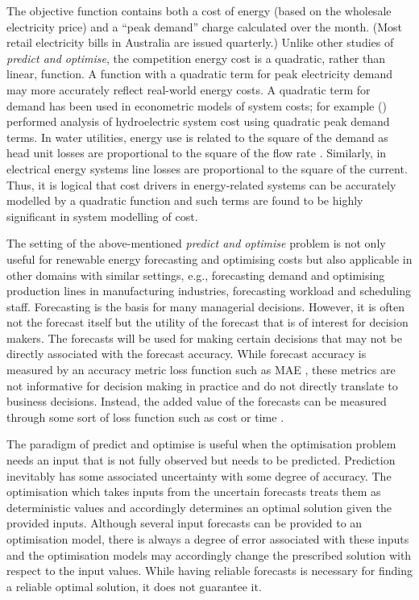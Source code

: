 \documentclass[conference]{IEEEtran}
\begin{document}
The objective function contains both a cost of energy (based on the wholesale electricity price) and a  ``peak demand'' charge calculated over the month. (Most retail electricity bills in Australia are issued quarterly.) Unlike other studies of {\it predict and optimise}, the competition energy cost is a quadratic, rather than linear, function. A function with a quadratic term for peak electricity demand may more accurately reflect real-world energy costs. A quadratic term for demand has been used in econometric models of system costs; for example (\cite{Fenrick, Lowry}) performed analysis of hydroelectric system cost using quadratic peak demand terms. In water utilities, energy use is related to the square of the demand as head unit losses are proportional to the square of the flow rate \cite{dasilveira}. Similarly, in electrical energy systems line losses are proportional to the square of the current. Thus, it is logical that cost drivers in energy-related systems can be accurately modelled by a quadratic function and such terms are found to be highly significant in system modelling of cost.

The setting of the above-mentioned {\it predict and optimise} problem is not only useful for renewable energy forecasting and optimising costs but also applicable in other domains with similar settings, e.g., forecasting demand and optimising production lines in manufacturing industries, forecasting workload and scheduling staff. Forecasting is the basis for many managerial decisions. However, it is often not the forecast itself but the utility of the forecast that is of interest for decision makers. The forecasts will be used for making certain decisions that may not be directly associated with the forecast accuracy. While forecast accuracy is measured by an accuracy metric loss function such as MAE \cite{hyndmanfpp3}, these metrics are not informative for decision making in practice and do not directly translate to business decisions. Instead, the added value of the forecasts can be measured through some sort of loss function such as cost or time \cite{abolghasemi2021effectively}.  


The paradigm of predict and optimise is useful when the optimisation problem needs an input that is not fully observed but needs to be predicted. Prediction inevitably has some associated uncertainty with some degree of accuracy. The optimisation which takes inputs from the uncertain forecasts treats them as deterministic values and accordingly determines an optimal solution given the provided inputs. Although several input forecasts can be provided to an optimisation model, there is always a degree of error associated with these inputs and the optimisation models may accordingly change the prescribed solution with respect to the input values. While having reliable forecasts is necessary for finding a reliable optimal solution, it does not guarantee it. 
 
\end{document}
